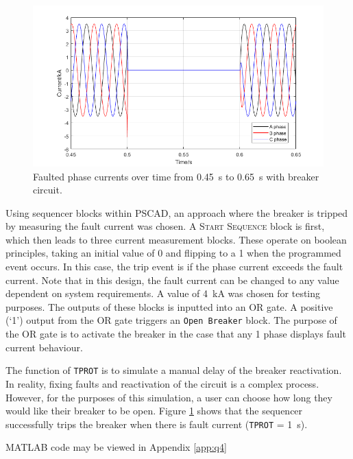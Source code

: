 \begin{figure}[H]
    \centering
    \includegraphics[width = \textwidth]{img/figure18.png}
    \caption{Faulted phase currents over time from \SI{0.45}{\second} to \SI{0.65}{\second} with breaker circuit.}
    \label{fig:fault2BRK}
\end{figure}
Using sequencer blocks within \textsc{PSCAD}, an approach where the breaker is tripped by measuring the fault current was chosen. A \textsc{Start Sequence} block is first, which then leads to three current measurement blocks. These operate on boolean principles, taking an initial value of 0 and flipping to a 1 when the programmed event occurs. In this case, the trip event is if the phase current exceeds the fault current. Note that in this design, the fault current can be changed to any value dependent on system requirements. A value of \SI{4}{\kilo\ampere} was chosen for testing purposes. The outputs of these blocks is inputted into an OR gate. A positive (`1') output from the OR gate triggers an \texttt{Open Breaker} block. The purpose of the OR gate is to activate the breaker in the case that any 1 phase displays fault current behaviour.

The function of \texttt{TPROT} is to simulate a manual delay of the breaker reactivation. In reality, fixing faults and reactivation of the circuit is a complex process. However, for the purposes of this simulation, a user can choose how long they would like their breaker to be open. Figure \ref{fig:fault2BRK} shows that the sequencer successfully trips the breaker when there is fault current (\texttt{TPROT} = \SI{1}{\second}).

MATLAB code may be viewed in Appendix \ref{app:q4}